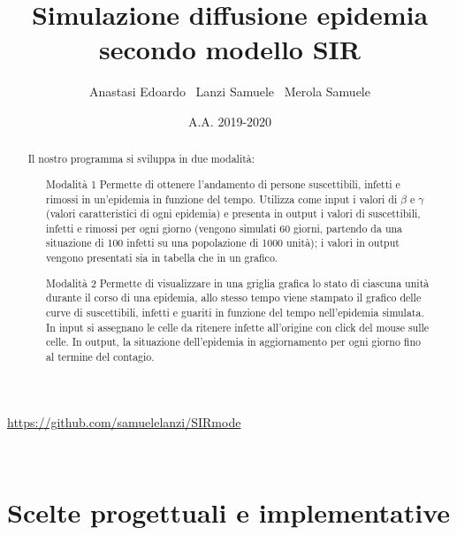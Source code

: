 \documentclass[a4paper,10 pt]{article}
\title{\huge{Simulazione diffusione epidemia secondo modello SIR}}
\author{Anastasi Edoardo \  Lanzi Samuele \ Merola Samuele}
\date{A.A. 2019-2020}
\begin{document}
\maketitle 
\begin{center}
\url{https://github.com/samuelelanzi/SIRmode}
\end{center}
\
\begin{abstract}
 Il nostro programma si sviluppa in due modalità:
 \begin{itemize}
	\item[Modalità 1] Permette di ottenere l'andamento di persone suscettibili, infetti e rimossi in un'epidemia in funzione del tempo. Utilizza come input i valori di $\beta$ e $\gamma$ (valori caratteristici di ogni epidemia) e presenta in output i valori di suscettibili, infetti e rimossi per ogni giorno (vengono simulati 60 giorni, partendo da una situazione di 100 infetti su una popolazione di 1000 unità); i valori in output vengono presentati sia in tabella che in un grafico.
 \item[Modalità 2] Permette di visualizzare in una griglia grafica lo stato di ciascuna unità durante il corso di una epidemia, allo stesso tempo viene stampato il grafico delle curve di suscettibili, infetti e guariti in funzione del tempo nell'epidemia simulata. In input si assegnano le celle da ritenere infette all'origine con click del mouse sulle celle. In output, la situazione dell'epidemia in aggiornamento per ogni giorno fino al termine del contagio.
  \end{itemize}
\end{abstract}



\section{Scelte progettuali e implementative} 
\end{document}
